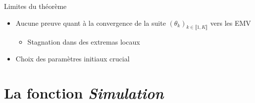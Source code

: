 \documentclass[11pt]{beamer}
\begin{document}
	\begin{frame}{Limites du théorème}
		\begin{block}{}
			\begin{itemize}
				\item Aucune preuve quant à la convergence de la suite $(\theta_k)_{k \in \llbracket 1, K \rrbracket}$ vers les EMV
				\begin{itemize}
					\item Stagnation dans des extremas locaux
				\end{itemize}
				\item Choix des paramètres initiaux crucial
			\end{itemize}
		\end{block}	
	\end{frame}

\section{La fonction \textit{Simulation}}
	
\end{document}
